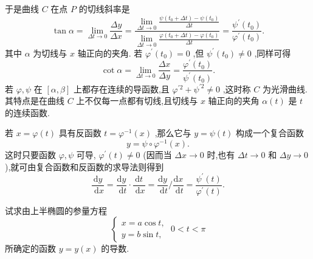 于是曲线 \(C\) 在点 \(P\) 的切线斜率是
\[
\tan \alpha  = \mathop{\lim }\limits_{{{\Delta t} \rightarrow  0}}\frac{\Delta y}{\Delta x} = \frac{\mathop{\lim }\limits_{{{\Delta t} \rightarrow  0}}\frac{\psi \left( {{t}_{0} + {\Delta t}}\right)  - \psi \left( {t}_{0}\right) }{\Delta t}}{\mathop{\lim }\limits_{{{\Delta t} \rightarrow  0}}\frac{\varphi \left( {{t}_{0} + {\Delta t}}\right)  - \varphi \left( {t}_{0}\right) }{\Delta t}}
= \frac{{\psi }^{\prime }\left( {t}_{0}\right) }{{\varphi }^{\prime }\left( {t}_{0}\right) }.
\]
其中 \(\alpha\) 为切线与 \(x\) 轴正向的夹角. 若 \({\varphi }^{\prime }\left( {t}_{0}\right)  = 0\) ,但 \({\psi }^{\prime }\left( {t}_{0}\right)  \neq  0\) ,同样可得
\[
\cot \alpha  = \mathop{\lim }\limits_{{{\Delta t} \rightarrow  0}}\frac{\Delta x}{\Delta y} = \frac{{\varphi }^{\prime }\left( {t}_{0}\right) }{{\psi }^{\prime }\left( {t}_{0}\right) }.
\]
若 \(\varphi ,\psi\) 在 \(\left\lbrack  {\alpha ,\beta }\right\rbrack\) 上都存在连续的导函数,且 \({\varphi }^{\prime 2} + {\psi }^{\prime 2} \neq  0\) ,这时称 \(C\) 为光滑曲线. 其特点是在曲线 \(C\) 上不仅每一点都有切线,且切线与 \(x\) 轴正向的夹角 \(\alpha \left( t\right)\) 是 \(t\) 的连续函数.

若 \(x = \varphi \left( t\right)\) 具有反函数 \(t = {\varphi }^{-1}\left( x\right)\) ,那么它与 \(y = \psi \left( t\right)\) 构成一个复合函数
\[
y = \psi  \circ  {\varphi }^{-1}\left( x\right) .
\]
这时只要函数 \(\varphi ,\psi\) 可导, \({\varphi }^{\prime }\left( t\right)  \neq  0\) (因而当 \({\Delta x} \rightarrow  0\) 时,也有 \({\Delta t} \rightarrow  0\) 和 \({\Delta y} \rightarrow  0\) ),就可由复合函数和反函数的求导法则得到
\[
\frac{\mathrm{d}y}{\mathrm{\;d}x} = \frac{\mathrm{d}y}{\mathrm{\;d}t} \cdot  \frac{\mathrm{d}t}{\mathrm{\;d}x} = \frac{\mathrm{d}y}{\mathrm{\;d}t}/\frac{\mathrm{d}x}{\mathrm{\;d}t} = \frac{{\psi }^{\prime }\left( t\right) }{{\varphi }^{\prime }\left( t\right) }. \tag{2}
\]
\begin{example}
试求由上半椭圆的参量方程
\[
\left\{  {\begin{array}{l} x = a\cos t, \\  y = b\sin t, \end{array}\;0 < t < \pi }\right.
\]
所确定的函数 \(y = y\left( x\right)\) 的导数.
\end{example}


